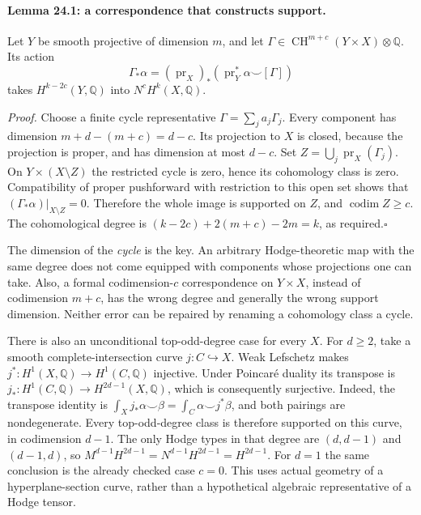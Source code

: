 \documentclass[11pt]{article}
\begin{document}
\paragraph{Lemma 24.1: a correspondence that constructs support.}
Let $Y$ be smooth projective of dimension $m$, and let
 $\Gamma\in\operatorname{CH}^{m+c}(Y\times X)\otimes\mathbb Q$.
 Its action
\[
 \Gamma_*\alpha=(\operatorname{pr}_X)_*
       (\operatorname{pr}_Y^*\alpha\smile[\Gamma])
\]
 takes $H^{k-2c}(Y,\mathbb Q)$ into $N^cH^k(X,\mathbb Q)$.

\emph{Proof.}
Choose a finite cycle representative $\Gamma=\sum_j a_j\Gamma_j$.
 Every component has dimension
 $m+d-(m+c)=d-c$. Its projection to $X$ is closed, because the
 projection is proper, and has dimension at most $d-c$. Set
 $Z=\bigcup_j\operatorname{pr}_X(\Gamma_j)$. On $Y\times(X\setminus Z)$
 the restricted cycle is zero, hence its cohomology class is zero.
 Compatibility of proper pushforward with restriction to this open set
 shows that $(\Gamma_*\alpha)|_{X\setminus Z}=0$. Therefore the whole
 image is supported on $Z$, and $\operatorname{codim}Z\geq c$.
 The cohomological degree is
 $(k-2c)+2(m+c)-2m=k$, as required.\hfill$\square$

The dimension of the \emph{cycle} is the key. An arbitrary Hodge-theoretic
 map with the same degree does not come equipped with components whose
 projections one can take. Also, a formal codimension-$c$ correspondence
 on $Y\times X$, instead of codimension $m+c$, has the wrong degree and
 generally the wrong support dimension. Neither error can be repaired by
 renaming a cohomology class a cycle.

There is also an unconditional top-odd-degree case for every $X$. For
 $d\geq2$, take a smooth complete-intersection curve $j:C\hookrightarrow X$.
 Weak Lefschetz makes $j^*:H^1(X,\mathbb Q)\to H^1(C,\mathbb Q)$
 injective. Under Poincar\'e duality its transpose is
 $j_*:H^1(C,\mathbb Q)\to H^{2d-1}(X,\mathbb Q)$, which is consequently
 surjective. Indeed, the transpose identity is
 $\int_X j_*\alpha\smile\beta=\int_C\alpha\smile j^*\beta$,
 and both pairings are nondegenerate. Every top-odd-degree class is
 therefore supported on this curve, in codimension $d-1$. The only
 Hodge types in that degree are $(d,d-1)$ and $(d-1,d)$, so
 $M^{d-1}H^{2d-1}=N^{d-1}H^{2d-1}=H^{2d-1}$. For $d=1$ the same
 conclusion is the already checked case $c=0$. This uses actual
 geometry of a hyperplane-section curve, rather than a hypothetical
 algebraic representative of a Hodge tensor.
\end{document}
